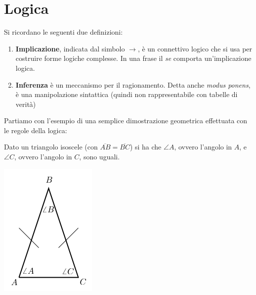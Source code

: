 \documentclass[a4paper,12pt, oneside]{book}
\begin{document}
\section{Logica}
Si ricordano le seguenti due definizioni:
\begin{enumerate}
	\item \textbf{Implicazione}, indicata dal simbolo $\to$, è un connettivo logico che si usa per costruire forme logiche complesse. In una frase il \textit{se} comporta un'implicazione logica.
	\item \textbf{Inferenza} è un meccanismo per il ragionamento. Detta anche \textit{modus ponens}, è una manipolazione sintattica (quindi non rappresentabile con tabelle di verità)
\end{enumerate}
Partiamo con l'esempio di una semplice dimostrazione geometrica effettuata con le regole della logica:
\begin{teorema}
	Dato un triangolo isoscele (con $\overline{AB}=\overline{BC}$) si ha che $\angle A$, ovvero l'angolo in $A$, e $\angle C$, ovvero l'angolo in $C$, sono uguali.
	\begin{center}
		\includegraphics[scale=0.5]{img/tri.png}
	\end{center}
\end{teorema}
\end{document}
